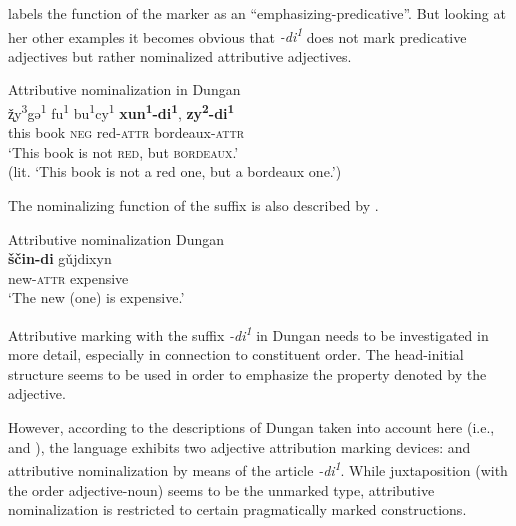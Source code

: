 \citet[82]{zevachina2001} labels the function of the marker as an “emphasizing\hyp{}predicative”. But looking at her other examples it becomes obvious that \textit{-di\textsuperscript{1}} does not mark predicative adjectives but rather nominalized attributive adjectives.
\begin{exe}
\ex \rm{Attributive nominalization in Dungan \citep[82]{zevachina2001}}\\
\gll	ž̨y\textsuperscript{3}gə\textsuperscript{1} fu\textsuperscript{1} bu\textsuperscript{1}cy\textsuperscript{1} \textbf{xun\textsuperscript{1}-di\textsuperscript{1}}, \textbf{zy\textsuperscript{2}-di\textsuperscript{1}}\\
	this book \textsc{neg} red-\textsc{attr} bordeaux-\textsc{attr}\\
\glt	‘This book is not \textsc{red}, but \textsc{bordeaux}.’\\
	(lit. ‘This book is not a red one, but a bordeaux one.’)
\end{exe}
The nominalizing function of the suffix is also described by \cite{kalimov1968}.
\begin{exe}
\ex \rm{Attributive nominalization Dungan \citep[484]{kalimov1968}}\\
\label{dungan nmlz}
\gll	\textbf{ščin-di} gǔjdixyn\\
	new-\textsc{attr} expensive\\
\glt	‘The new (one) is expensive.’
\end{exe}
Attributive marking with the suffix \textit{-di\textsuperscript{1}} in Dungan needs to be investigated in more detail, especially in connection to constituent order. The head-initial structure seems to be used in order to emphasize the property denoted by the adjective.

However, according to the descriptions of Dungan taken into account here (i.e., \citealt{kalimov1968} and \citealt{zevachina2001}), the language exhibits two adjective attribution marking devices:  and attributive nominalization by means of the article \textit{-di\textsuperscript{1}}. While juxtaposition (with the order adjective-noun) seems to be the unmarked type, attributive nominalization is restricted to certain pragmatically marked constructions.

